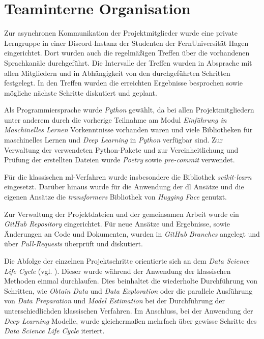 \section{Teaminterne Organisation}\label{sec:teaminterneorganisation}

Zur asynchronen Kommunikation der Projektmitglieder wurde eine private Lerngruppe in einer Discord-Instanz der Studenten der FernUniversität Hagen eingerichtet.
Dort wurden auch die regelmäßigen Treffen über die vorhandenen Sprachkanäle durchgeführt.
Die Intervalle der Treffen wurden in Absprache mit allen Mitgliedern und in Abhängigkeit von den durchgeführten Schritten festgelegt.
In den Treffen wurden die erreichten Ergebnisse besprochen sowie mögliche nächste Schritte diskutiert und geplant.

Als Programmiersprache wurde \textit{Python} gewählt, da bei allen Projektmitgliedern unter anderem durch die vorherige Teilnahme am Modul \textit{Einführung in Maschinelles Lernen} Vorkenntnisse vorhanden waren und viele Bibliotheken für maschinelles Lernen und \textit{Deep Learning} in \textit{Python} verfügbar sind.
Zur Verwaltung der verwendeten Python-Pakete und zur Vereinheitlichung und Prüfung der erstellten Dateien wurde \textit{Poetry} \cite{poetry2025} sowie \textit{pre-commit}\cite{precommit2025} verwendet.

Für die klassischen \gls{ml}-Verfahren wurde insbesondere die Bibliothek \textit{scikit-learn} eingesetzt.
Darüber hinaus wurde für die Anwendung der \gls{dl} Ansätze und die eigenen Ansätze die \textit{transformers} Bibliothek von \textit{Hugging Face} genutzt.

Zur Verwaltung der Projektdateien und der gemeinsamen Arbeit wurde ein \textit{GitHub Repository} \cite{githubrepo2025} eingerichtet.
Für neue Ansätze und Ergebnisse, sowie Änderungen an Code und Dokumenten, wurden in \textit{GitHub} \textit{Branches} angelegt und über \textit{Pull-Requests} überprüft und diskutiert.

Die Abfolge der einzelnen Projektschritte orientierte sich an dem \textit{Data Science Life Cycle} (vgl. \cite[Abb. 2]{Stodden2020}).
Dieser wurde während der Anwendung der klassischen Methoden einmal durchlaufen.
Dies beinhaltet die wiederholte Durchführung von Schritten, wie \textit{Obtain Data} und \textit{Data Exploration} oder die parallele Ausführung von \textit{Data Preparation} und \textit{Model Estimation} bei der Durchführung der unterschiedlichden klassischen Verfahren.
Im Anschluss, bei der Anwendung der \textit{Deep Learning} Modelle, wurde gleichermaßen mehrfach über gewisse Schritte des \textit{Data Science Life Cycle} iteriert.
